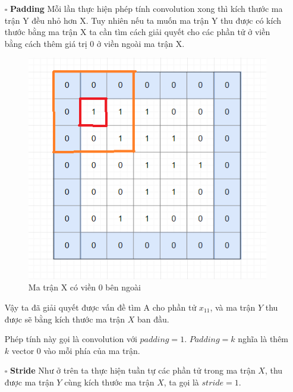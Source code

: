 \begin{itemize}
\item[$\square$] \textbf{Padding}
Mỗi lần thực hiện phép tính convolution xong thì kích thước ma trận Y đều nhỏ hơn X. Tuy nhiên nếu ta muốn ma trận Y thu được có kích thước bằng ma trận X ta cần tìm cách giải quyết cho các phần tử ở viền bằng cách thêm giá trị 0 ở viền ngoài ma trận X.

\FloatBarrier
\begin{figure}[htp]
\begin{center}
\includegraphics[scale=0.65]{chap2/c2_figs/10.png}
\end{center}
\caption{Ma trận X có viền 0 bên ngoài}
\label{fig:padding}
\end{figure}
\FloatBarrier

Vậy ta đã giải quyết được vấn đề tìm A cho phần tử $x_{11}$, và ma trận $Y$ thu được sẽ bằng kích thước ma trận $X$ ban đầu.

Phép tính này gọi là convolution với $padding=1$. $Padding=k$ nghĩa là thêm $k$ vector $0$ vào mỗi phía của ma trận.

\item[$\square$] \textbf{Stride}
Như ở trên ta thực hiện tuần tự các phần tử trong ma trận $X$, thu được ma trận $Y$ cùng kích thước ma trận $X$, ta gọi là $stride=1$.


\end{itemize}
